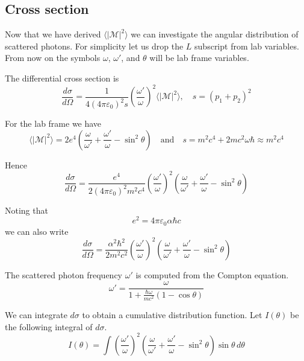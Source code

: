 \documentclass[12pt]{article}
\begin{document}
\subsection*{Cross section}
Now that we have derived $\langle|\mathcal{M}|^2\rangle$
we can investigate the angular distribution of scattered photons.
For simplicity let us drop the $L$ subscript from lab variables.
From now on the symbols $\omega$, $\omega'$, and $\theta$ will be lab frame variables.

\bigskip
The differential cross section is
\begin{equation*}
\frac{d\sigma}{d\Omega}=\frac{1}{4(4\pi\varepsilon_0)^2s}
\left(\frac{\omega'}{\omega}\right)^2\langle|\mathcal{M}|^2\rangle,\quad s=(p_1+p_2)^2
\end{equation*}

For the lab frame we have
\begin{equation*}
\langle|\mathcal{M}|^2\rangle
=2e^4\left(
\frac{\omega}{\omega'}+\frac{\omega'}{\omega}-\sin^2\theta
\right)
\quad\text{and}\quad
s=m^2c^4+2mc^2\omega\hbar\approx m^2c^4
\end{equation*}

Hence
\begin{equation*}
\frac{d\sigma}{d\Omega}
=\frac{e^4}{2(4\pi\varepsilon_0)^2m^2c^4}
\left(\frac{\omega'}{\omega}\right)^2
\left(
\frac{\omega}{\omega'}+\frac{\omega'}{\omega}-\sin^2\theta
\right)
\end{equation*}

Noting that
\begin{equation*}
e^2=4\pi\varepsilon_0\alpha\hbar c
\end{equation*}
we can also write
\begin{equation*}
\frac{d\sigma}{d\Omega}
=\frac{\alpha^2\hbar^2}{2m^2c^2}
\left(\frac{\omega'}{\omega}\right)^2
\left(
\frac{\omega}{\omega'}+\frac{\omega'}{\omega}-\sin^2\theta
\right)
\end{equation*}

The scattered photon frequency $\omega'$ is computed from the Compton equation.
\begin{equation*}
\omega'=\frac{\omega}{1+\frac{\hbar\omega}{mc^2}(1-\cos\theta)}
\end{equation*}

We can integrate $d\sigma$ to obtain a cumulative distribution function.
Let $I(\theta)$ be the following integral of $d\sigma$.
\begin{equation*}
I(\theta)=
\int
\left(\frac{\omega'}{\omega}\right)^2
\left(\frac{\omega}{\omega'}+\frac{\omega'}{\omega}-\sin^2\theta\right)
\sin\theta\,d\theta
\end{equation*}
\end{document}
